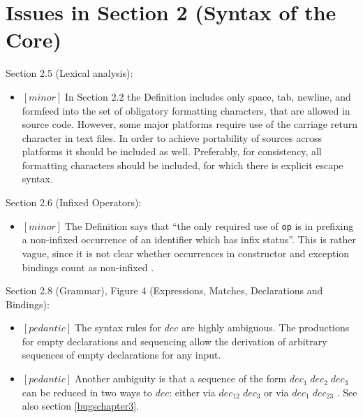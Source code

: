 \documentclass{article}
\newcommand{\m}[1]{$[\mathit{#1}]\;$}
\newcommand{\minor}{\m{minor}}
\newcommand{\pedantic}{\m{pedantic}}
\begin{document}
\section{Issues in Section 2 (Syntax of the Core)}
\label{bugschapter2}




Section 2.5 (Lexical analysis):
\nopagebreak

\begin{itemize}
\item \minor In Section 2.2 the Definition includes only space, tab, newline, and formfeed into the set of obligatory formatting characters, that are allowed in source code. However, some major platforms require use of the carriage return character in text files. In order to achieve portability of sources across platforms it should be included as well. Preferably, for consistency, all formatting characters should be included, for which there is explicit escape syntax.
\end{itemize}


Section 2.6 (Infixed Operators):
\nopagebreak

\begin{itemize}
\item \minor The Definition says that ``the only required use of {\tt op} is in prefixing a non-infixed occurrence of an identifier which has infix status''. This is rather vague, since it is not clear whether occurrences in constructor and exception bindings count as non-infixed \cite{mistakes}.
\end{itemize}


Section 2.8 (Grammar), Figure 4 (Expressions, Matches, Declarations and Bindings):
\nopagebreak

\begin{itemize}
\item \pedantic The syntax rules for $\mathit{dec}$ are highly ambiguous. The productions for empty declarations and sequencing allow the derivation of arbitrary sequences of empty declarations for any input.

\item \pedantic Another ambiguity is that a sequence of the form $\mathit{dec}_1\;\mathit{dec}_2\;\mathit{dec}_3$ can be reduced in two ways to $\mathit{dec}$: either via $\mathit{dec}_{12}\;\mathit{dec}_3$ or via $\mathit{dec}_1\;\mathit{dec}_{23}$ \cite{mistakes}. See also section \ref{bugschapter3}.
\end{itemize}
\end{document}
